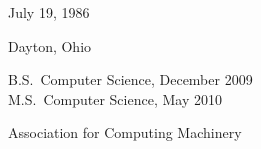 %
%
%
\begin{center}
{\large\thesisauthor}
\end{center}
%
%
\newcommand{\vitalabel}[1]%
  {\raisebox{0pt}[1ex][0pt]
    {\makebox[\labelwidth][l]%
      {\parbox[t]{\labelwidth}{\hspace{0pt}\textbf{#1}}}}}
%
%
\begin{list}
  {}%
  { \renewcommand{\makelabel}{\vitalabel}%
    \setlength{\labelwidth}{100pt}%
    \setlength{\leftmargin}{120pt}%
    \setlength{\itemindent}{0pt}%
    \setlength{\parsep}{\baselineskip}%
    \setlength{\itemsep}{5pt}%
    }
\item[Date of Birth] July 19, 1986
\item[Place of Birth] Dayton, Ohio
\item[Degrees] B.S.\ Computer Science, December 2009 \\
	M.S.\ Computer Science, May 2010
\item[Professional\linebreak Societies]
  Association for Computing Machinery
%   
\end{list}
\flushright
\thesismonth\ \thesisyear

